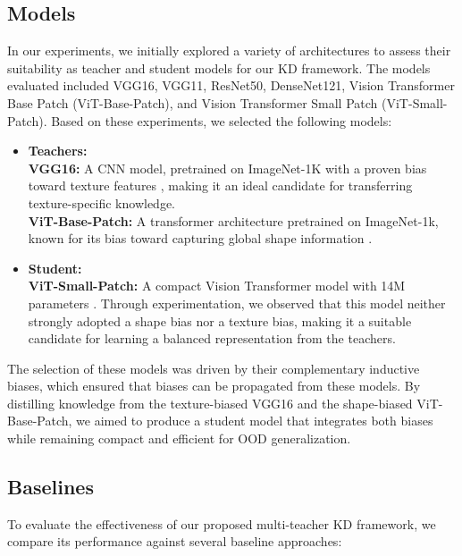 \documentclass{article}
\begin{document}
\subsection{Models}
In our experiments, we initially explored a variety of architectures to assess their suitability as teacher and student models for our KD framework. The models evaluated included VGG16, VGG11, ResNet50, DenseNet121, Vision Transformer Base Patch (ViT-Base-Patch), and Vision Transformer Small Patch (ViT-Small-Patch). Based on these experiments, we selected the following models:

\begin{itemize}[noitemsep, topsep=0pt]
    \item \textbf{Teachers:} \\
     \textbf{VGG16:} A CNN model, pretrained on ImageNet-1K with a proven bias toward texture features \cite{hermann2020origins}, making it an ideal candidate for transferring texture-specific knowledge.\\
     \textbf{ViT-Base-Patch:} A transformer architecture pretrained on ImageNet-1k, known for its bias toward capturing global shape information \cite{naseer2021intriguing}.
    \item \textbf{Student:} \\
    \textbf{ViT-Small-Patch:} A compact Vision Transformer model with 14M parameters \cite{rw2019timm}. Through experimentation, we observed that this model neither strongly adopted a shape bias nor a texture bias, making it a suitable candidate for learning a balanced representation from the teachers.\\
\end{itemize}

The selection of these models was driven by their complementary inductive biases, which ensured that biases can be propagated from these models. By distilling knowledge from the texture-biased VGG16 and the shape-biased ViT-Base-Patch, we aimed to produce a student model that integrates both biases while remaining compact and efficient for OOD generalization.


\subsection{Baselines}
To evaluate the effectiveness of our proposed multi-teacher KD framework, we compare its performance against several baseline approaches:
\end{document}
